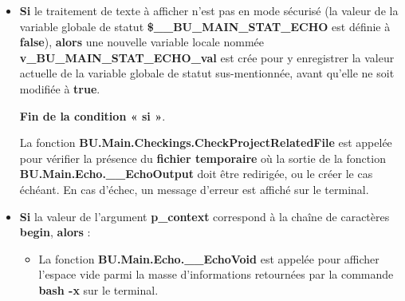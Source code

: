 \documentclass[a4paper,10pt]{article}
\begin{document}
\begin{itemize}
    \item
    {
        \begin{justify}
            \textbf{\color{cond}Si} le traitement de texte à afficher n'est pas en mode sécurisé (la valeur de la variable globale de statut \textbf{\color{vars}\$\_\_BU\_MAIN\_STAT\_ECHO} est définie à \textbf{false}), \textbf{\color{cond}alors} une nouvelle variable locale nommée \textbf{\color{vars}v\_BU\_MAIN\_STAT\_ECHO\_val} est crée pour y enregistrer la valeur actuelle de la variable globale de statut sus-mentionnée, avant qu'elle ne soit modifiée à \textbf{true}.
        \end{justify}

        \setlength{\parskip}{1em}

        \begin{justify}
            \textbf{\color{cond}Fin de la condition « si »}.
        \end{justify}
    }

    \begin{justify}\setlength{\parskip}{2em}
        La fonction \textbf{\color{func}BU.Main.Checkings.CheckProjectRelatedFile} est appelée pour vérifier la présence du \textbf{\color{path}fichier temporaire} où la sortie de la fonction \textbf{\color{func}BU.Main.Echo.\_\_EchoOutput} doit être redirigée, ou le créer le cas échéant. En cas d'échec, un message d'erreur est affiché sur le terminal.
    \end{justify}

    \item
    {
        \setlength{\parskip}{2em}

        \begin{justify}
            \textbf{\color{cond}Si} la valeur de l'argument \textbf{\color{vars}p\_context} correspond à la chaîne de caractères \textbf{begin}, \textbf{\color{cond}alors} :
        \end{justify}

        \setlength{\parskip}{1em}

        \begin{itemize}
            \item
            {
                \begin{justify}
                    La fonction \textbf{\color{func}BU.Main.Echo.\_\_EchoVoid} est appelée pour afficher l'espace vide parmi la masse d'informations retournées par la commande \textbf{\color{cmds}bash -x} sur le terminal.
                \end{justify}
            }


\end{itemize}}
\end{itemize}
\end{document}
